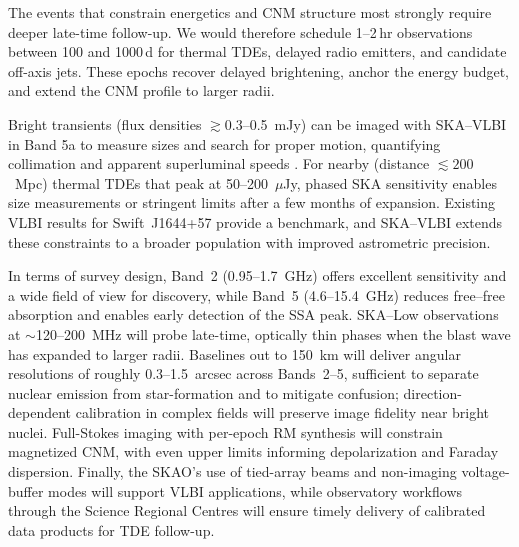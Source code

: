 \documentclass[a4paper,11pt]{article}
\begin{document}
The events that constrain energetics and CNM structure most strongly require deeper late-time follow-up. We would therefore schedule 1--2\,hr observations between 100 and 1000\,d for thermal TDEs, delayed radio emitters, and candidate off-axis jets. These epochs recover delayed brightening, anchor the energy budget, and extend the CNM profile to larger radii.

Bright transients (flux densities $\gtrsim 0.3$--0.5~mJy) can be imaged with SKA--VLBI in Band 5a to measure sizes and search for proper motion, quantifying collimation and apparent superluminal speeds \citep[e.g. AT2019dsg;][]{Mohan2022}. For nearby (distance $\lesssim 200$~Mpc) thermal TDEs that peak at 50--200~$\mu$Jy, phased SKA sensitivity enables size measurements or stringent limits after a few months of expansion. Existing VLBI results for Swift~J1644+57 \citep{Yang2016} provide a benchmark, and SKA--VLBI extends these constraints to a broader population with improved astrometric precision.

In terms of survey design, Band~2 (0.95--1.7~GHz) offers excellent sensitivity and a wide field of view for discovery, while Band~5 (4.6--15.4~GHz) reduces free--free absorption and enables early detection of the SSA peak. SKA--Low observations at $\sim$120--200~MHz will probe late-time, optically thin phases when the blast wave has expanded to larger radii. Baselines out to 150~km will deliver angular resolutions of roughly 0.3--1.5~arcsec across Bands~2--5, sufficient to separate nuclear emission from star-formation and to mitigate confusion; direction-dependent calibration in complex fields will preserve image fidelity near bright nuclei. Full-Stokes imaging with per-epoch RM synthesis will constrain magnetized CNM, with even upper limits informing depolarization and Faraday dispersion. Finally, the SKAO's use of tied-array beams and non-imaging voltage-buffer modes will support VLBI applications, while observatory workflows through the Science Regional Centres will ensure timely delivery of calibrated data products for TDE follow-up.
\end{document}
